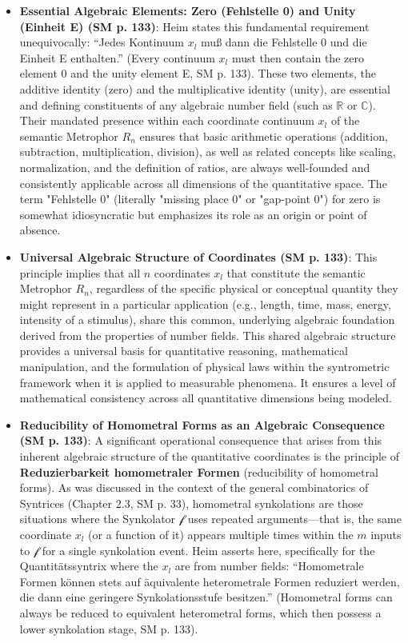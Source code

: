 \documentclass[12pt]{article}
\newcommand{\q}[1]{\enquote{#1}}
\newcommand{\synkolationsstufe}{m}
\newcommand{\semantischermetrophor}{R_n}
\newcommand{\funktionaloperator}{\mathcal{f}}
\begin{document}
\begin{itemize}
    \item \textbf{Essential Algebraic Elements: Zero (Fehlstelle 0) and Unity (Einheit E) (SM p. 133)}:
    Heim states this fundamental requirement unequivocally: \q{Jedes Kontinuum \( x_l \) muß dann die Fehlstelle 0 und die Einheit E enthalten.} (Every continuum \( x_l \) must then contain the zero element 0 and the unity element E, SM p. 133). These two elements, the additive identity (zero) and the multiplicative identity (unity), are essential and defining constituents of any algebraic number field (such as \( \mathbb{R} \) or \( \mathbb{C} \)). Their mandated presence within each coordinate continuum \( x_l \) of the semantic Metrophor \( \semantischermetrophor \) ensures that basic arithmetic operations (addition, subtraction, multiplication, division), as well as related concepts like scaling, normalization, and the definition of ratios, are always well-founded and consistently applicable across all dimensions of the quantitative space. The term "Fehlstelle 0" (literally "missing place 0" or "gap-point 0") for zero is somewhat idiosyncratic but emphasizes its role as an origin or point of absence.
    \item \textbf{Universal Algebraic Structure of Coordinates (SM p. 133)}:
    This principle implies that all \( n \) coordinates \( x_l \) that constitute the semantic Metrophor \( \semantischermetrophor \), regardless of the specific physical or conceptual quantity they might represent in a particular application (e.g., length, time, mass, energy, intensity of a stimulus), share this common, underlying algebraic foundation derived from the properties of number fields. This shared algebraic structure provides a universal basis for quantitative reasoning, mathematical manipulation, and the formulation of physical laws within the syntrometric framework when it is applied to measurable phenomena. It ensures a level of mathematical consistency across all quantitative dimensions being modeled.
    \item \textbf{Reducibility of Homometral Forms as an Algebraic Consequence (SM p. 133)}:
    A significant operational consequence that arises from this inherent algebraic structure of the quantitative coordinates is the principle of \textbf{Reduzierbarkeit homometraler Formen} (reducibility of homometral forms). As was discussed in the context of the general combinatorics of Syntrices (Chapter 2.3, SM p. 33), homometral synkolations are those situations where the Synkolator \( \funktionaloperator \) uses repeated arguments—that is, the same coordinate \( x_l \) (or a function of it) appears multiple times within the \( \synkolationsstufe \) inputs to \( \funktionaloperator \) for a single synkolation event. Heim asserts here, specifically for the Quantitätssyntrix where the \(x_l\) are from number fields: \q{Homometrale Formen können stets auf äquivalente heterometrale Formen reduziert werden, die dann eine geringere Synkolationsstufe besitzen.} (Homometral forms can always be reduced to equivalent heterometral forms, which then possess a lower synkolation stage, SM p. 133).

\end{itemize}
\end{document}
